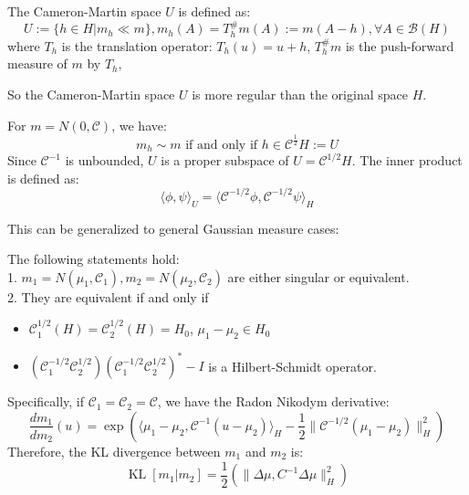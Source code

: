 \begin{definition}
The Cameron-Martin space $U$ is defined as:
\begin{equation}
  U:=\{h\in H| m_h\ll m\},m_h(A)=T_h^\#m(A):= m(A-h),\forall A \in \mathcal{B}(H)
\end{equation} 
where $T_h$ is the translation operator: $T_h(u)=u + h$, $T_h^\#m$ is the push-forward measure of $m$ by $T_h$, 
\end{definition}
So the Cameron-Martin space $U$ is more regular than the original space $H$.

\begin{theorem}
  For $m=N(0, \mathcal{C})$, we have:
  \begin{equation}
    m_h\sim m \text{ if and only if } h\in \mathcal{C}^\frac{1}{2}H:=U
  \end{equation}
  Since $\mathcal{C}^{-1}$ is unbounded, $U$ is a proper subspace of $U = \mathcal{C}^{1/2}H$.
  The inner product is defined as:
\begin{equation}
  \langle \phi, \psi\rangle_U = \langle \mathcal{C}^{-1/2}\phi, \mathcal{C}^{-1/2}\psi\rangle_H
\end{equation}
\end{theorem}

This can be generalized to general Gaussian measure cases:
\begin{theorem}
  The following statements hold:\\
  1. $m_1 = N(\mu_1, \mathcal{C}_1), m_2 = N(\mu_2, \mathcal{C}_2)$ are either singular or equivalent.\\
  2. They are equivalent if and only if 
  \begin{itemize}
      \item $\mathcal{C}_1^{1/2}(H) = \mathcal{C}_2^{1/2}(H)=H_0$, $\mu_1 - \mu_2 \in H_0$
      \item $(\mathcal{C}_1^{-1/2}\mathcal{C}_2^{1/2})(\mathcal{C}_1^{-1/2}\mathcal{C}_2^{1/2})^*-I$ is a Hilbert-Schmidt operator.
  \end{itemize}
  Specifically, if $\mathcal{C}_1=\mathcal{C}_2=\mathcal{C}$, we have the Radon Nikodym derivative:
  \begin{equation} 
    \frac{dm_1}{dm_2}(u) = \exp{\left(\langle \mu_1 - \mu_2, \mathcal{C}^{-1}(u - \mu_2) \rangle_H - \frac{1}{2}\|\mathcal{C}^{-1/2}(\mu_1 - \mu_2)\|^2_H\right)}
  \end{equation}
  Therefore, the KL divergence between $m_1$ and $m_2$ is:
  \begin{equation}
    \operatorname{KL}[m_1|m_2] = \frac{1}{2}\left(\|\Delta\mu, C^{-1}\Delta \mu\|^2_H\right)
  \end{equation}
\end{theorem}


